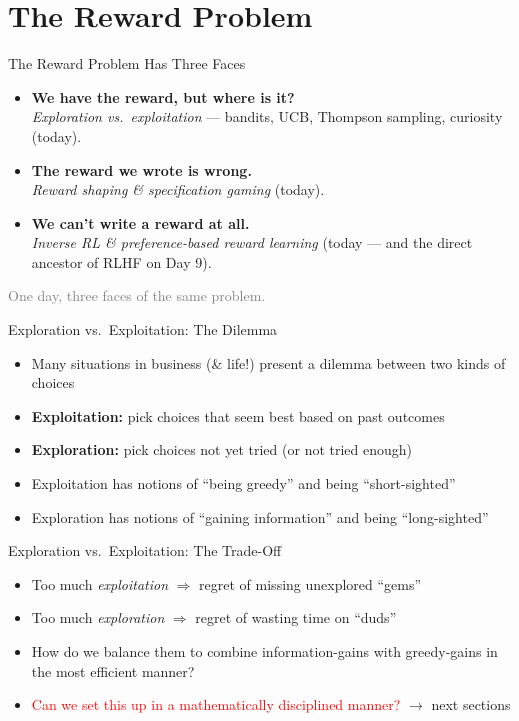 \section{The Reward Problem}
\begin{frame}{The Reward Problem Has Three Faces}
\begin{itemize}
    \setlength{\itemsep}{0.7em}
    \item \textbf{We have the reward, but where is it?}\\
          \emph{Exploration vs.\ exploitation} --- bandits, UCB, Thompson sampling, curiosity (today).
    \item \textbf{The reward we wrote is wrong.}\\
          \emph{Reward shaping \& specification gaming} (today).
    \item \textbf{We can't write a reward at all.}\\
          \emph{Inverse RL \& preference-based reward learning} (today --- and the direct ancestor of RLHF on Day 9).
\end{itemize}
\vspace{0.6em}
\centering\small\textcolor{gray}{One day, three faces of the same problem.}
\end{frame}

\begin{frame}{Exploration vs.\ Exploitation: The Dilemma}
\begin{itemize}
    \setlength{\itemsep}{0.5em}
    \item Many situations in business (\& life!) present a dilemma between two kinds of choices
    \item \textbf{Exploitation:} pick choices that seem best based on past outcomes
    \item \textbf{Exploration:} pick choices not yet tried (or not tried enough)
    \item Exploitation has notions of ``being greedy'' and being ``short-sighted''
    \item Exploration has notions of ``gaining information'' and being ``long-sighted''
\end{itemize}
\end{frame}

\begin{frame}{Exploration vs.\ Exploitation: The Trade-Off}
\begin{itemize}
    \setlength{\itemsep}{0.6em}
    \item Too much \emph{exploitation} $\Rightarrow$ regret of missing unexplored ``gems''
    \item Too much \emph{exploration} $\Rightarrow$ regret of wasting time on ``duds''
    \item How do we balance them to combine information-gains with greedy-gains in the most efficient manner?
    \item \textcolor{red}{Can we set this up in a mathematically disciplined manner?} $\to$ next sections
\end{itemize}
\end{frame}

